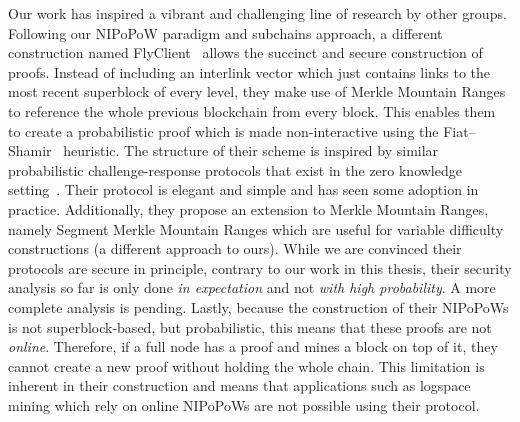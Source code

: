 Our work has inspired a vibrant and challenging line of research by other
groups. Following our NIPoPoW paradigm and subchains approach, a
different construction named FlyClient~\cite{flyclient} allows the succinct and
secure construction of proofs. Instead of including an interlink vector
which just contains links to the most recent superblock of every level, they
make use of Merkle Mountain Ranges to reference the whole previous blockchain
from every block. This enables them to create a probabilistic proof which is
made non-interactive using the Fiat--Shamir~\cite{fiatshamir} heuristic. The
structure of their scheme is inspired by similar probabilistic
challenge-response protocols that exist in the zero knowledge
setting~\cite{schnorr}. Their protocol is elegant and simple and has seen some
adoption in practice. Additionally, they propose an extension to Merkle
Mountain Ranges, namely Segment Merkle Mountain Ranges which are useful for
variable difficulty constructions (a different approach to ours). While we are
convinced their protocols are secure in principle, contrary to our work in this
thesis, their security analysis so far is only done \emph{in expectation} and
not \emph{with high probability}. A more complete analysis is pending. Lastly,
because the construction of their NIPoPoWs is not superblock-based, but
probabilistic, this means that these proofs are not \emph{online}. Therefore,
if a full node has a proof and mines a block on top of it, they cannot create a
new proof without holding the whole chain. This limitation is inherent in their
construction and means that applications such as logspace mining which rely on
online NIPoPoWs are not possible using their protocol.

